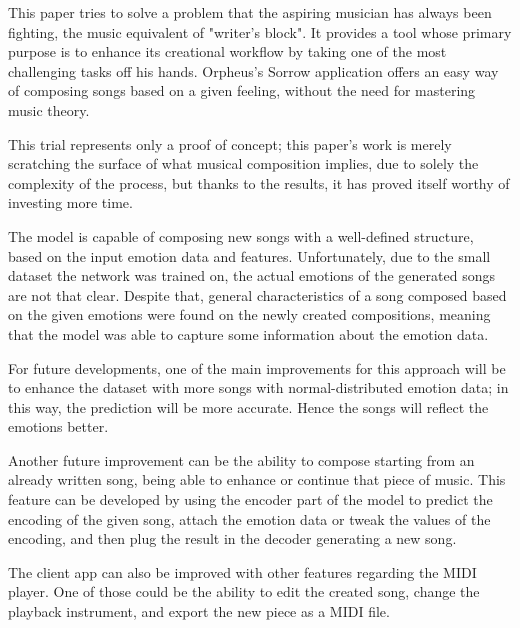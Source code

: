
This paper tries to solve a problem that the aspiring musician has always been fighting,
the music equivalent of "writer's block".
It provides a tool whose primary purpose is to enhance its creational
workflow by taking one of the most challenging tasks off his hands.
Orpheus's Sorrow application offers an easy way of composing songs based on a given feeling,
without the need for mastering music theory.

This trial represents only a proof of concept;
this paper's work is merely scratching the surface of what musical composition implies,
due to solely the complexity of the process,
but thanks to the results,
it has proved itself worthy of investing more time.

The model is capable of composing new songs with a well-defined structure,
based on the input emotion data and features.
Unfortunately, due to the small dataset the network was trained on,
the actual emotions of the generated songs are not that clear.
Despite that,
general characteristics of a song composed based on the given emotions were
found on the newly created compositions,
meaning that the model was able to capture some information about the emotion data.

For future developments,
one of the main improvements for this approach will be to enhance the dataset
with more songs with normal-distributed emotion data;
in this way, the prediction will be more accurate.
Hence the songs will reflect the emotions better.

Another future improvement can be the ability to compose starting
from an already written song,
being able to enhance or continue that piece of music.
This feature can be developed by using the encoder part of the model to predict the
encoding of the given song, attach the emotion data or tweak the values of the encoding,
and then plug the result in the decoder generating a new song.

The client app can also be improved with other features regarding the MIDI player.
One of those could be the ability to edit the created song,
change the playback instrument, and export the new piece as a MIDI file.
